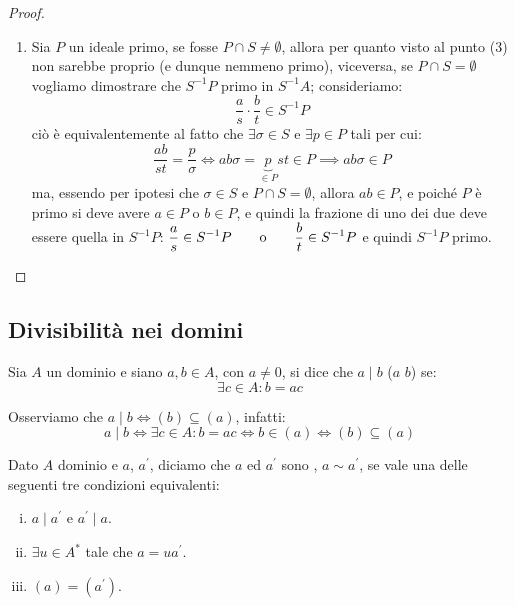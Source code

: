 \documentclass[11pt]{scrartcl}
\begin{document}
\begin{proof}
\begin{enumerate}[(1)]
        \item Sia $P$ un ideale primo, se fosse $P \cap S \ne \emptyset$, allora per quanto visto al punto (3) non sarebbe proprio (e dunque nemmeno primo), viceversa, se $P \cap S = \emptyset$ vogliamo dimostrare che $S^{-1}P$ primo in $S^{-1}A$; consideriamo:
                \[ \frac{a}{s} \cdot \frac{b}{t} \in S^{-1}P
                    \]
            ciò è equivalentemente al fatto che $\exists \sigma \in S$ e $\exists p \in P$ tali per cui:
                \[ \frac{ab}{st} = \frac{p}{\sigma} \iff ab\sigma = \underbrace{p}_{\in P}st \in P \implies ab\sigma \in P
                    \]
            ma, essendo per ipotesi che $\sigma \in S$ e $P \cap S = \emptyset$, allora $ab \in P$, e poiché $P$ è primo si deve avere $a \in P$ o $b \in P$, e quindi la frazione di uno dei due deve essere quella in $S^{-1}P$: $\displaystyle\frac{a}{s} \in S^{-1}P \qquad \text o \qquad \frac{b}{t} \in S^{-1}P$
            e quindi $S^{-1}P$ primo.
    \end{enumerate}
\end{proof}

\newpage
\subsection{Divisibilità nei domini}
\begin{definition}
    Sia $A$  un dominio e siano $a,b \in A$, con $a \ne 0$, si dice che $a \mid b$ ($a$  $b$) se:
    \[ \exists c \in A : b = ac
        \]
\end{definition}

\begin{remark}
    Osserviamo che $a \mid b \iff (b) \subseteq (a)$, infatti:
    \[ a \mid b \iff \exists c \in A : b = ac \iff b \in (a) \iff (b) \subseteq (a)
        \]
\end{remark}

\begin{definition}
    Dato $A$ dominio e $a$, $a^{\prime}$, diciamo che $a$ ed $a^{\prime}$ sono , $a \sim a^{\prime}$,
    se vale una delle seguenti tre condizioni equivalenti:
    \begin{enumerate}[(i)]
        \item $a \mid a^{\prime}$ e $a^{\prime} \mid a$.
        \item $\exists u \in A^*$ tale che $a = ua^{\prime}$.
        \item $(a) = (a^{\prime})$.
    \end{enumerate}
\end{definition}
\end{document}

